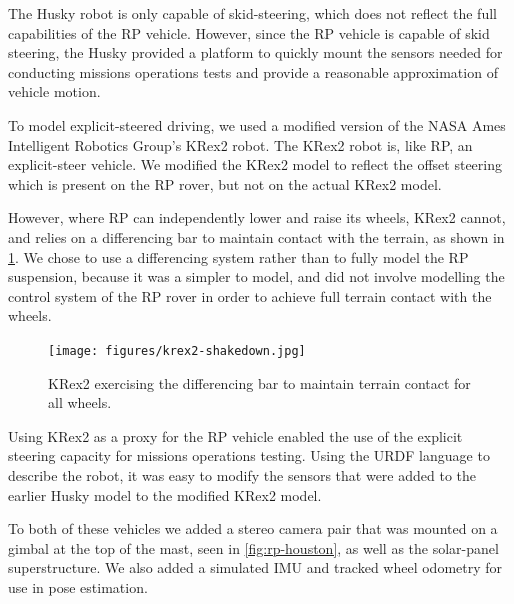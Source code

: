 \documentclass[twocolumn,letterpaper]{IEEEAerospaceCLS}  %
\begin{document}
The Husky robot is only capable of skid-steering, which does not reflect the full capabilities of the RP vehicle.  However, since the RP vehicle is capable of skid steering, the Husky provided a platform to quickly mount the sensors needed for conducting missions operations tests and provide a reasonable approximation of vehicle motion.  

To model explicit-steered driving, we used a modified version of the NASA Ames Intelligent Robotics Group's KRex2 robot.  The KRex2 robot is, like RP, an explicit-steer vehicle.  We modified the KRex2 model to reflect the offset steering which is present on the RP rover, but not on the actual KRex2 model.  

However, where RP can independently lower and raise its wheels, KRex2 cannot, and relies on a differencing bar to maintain contact with the terrain, as shown in \cref{fig:krex2-differencing}. We chose to use a differencing system rather than to fully model the RP suspension, because it was a simpler to model, and did not involve modelling the control system of the RP rover in order to achieve full terrain contact with the wheels.

\begin{figure}[htp]
\texttt{[image: figures/krex2-shakedown.jpg]}
\caption{KRex2 exercising the differencing bar to maintain terrain contact for all wheels. \label{fig:krex2-differencing}}
\end{figure}

Using KRex2 as a proxy for the RP vehicle enabled the use of the explicit steering capacity for missions operations testing.  
Using the URDF language to describe the robot, it was easy to modify the sensors that were added to the earlier Husky model to the modified KRex2 model.  


To both of these vehicles we added a stereo camera pair that was mounted on a gimbal at the top of the mast, seen in \cref{fig:rp-houston}, as well as the solar-panel superstructure. 
We also added a simulated IMU and tracked wheel odometry for use in pose estimation.  
\end{document}
